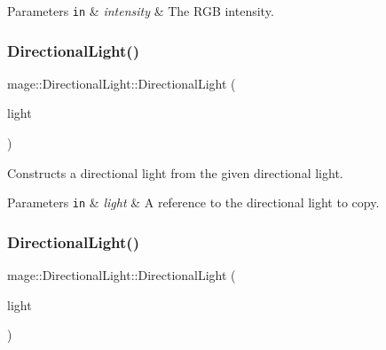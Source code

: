 \begin{DoxyParams}[1]{Parameters}
\mbox{\tt in}  & {\em intensity} & The R\+GB intensity. \\
\hline
\end{DoxyParams}
\hypertarget{classmage_1_1_directional_light_a777b1b8e00a51ba84f6af774a7b519ea}{}\label{classmage_1_1_directional_light_a777b1b8e00a51ba84f6af774a7b519ea} 
\subsubsection{\texorpdfstring{Directional\+Light()}{DirectionalLight()}\hspace{0.1cm}{\footnotesize\ttfamily [2/3]}}
{\footnotesize\ttfamily mage\+::\+Directional\+Light\+::\+Directional\+Light (\begin{DoxyParamCaption}\item[{const \hyperlink{classmage_1_1_directional_light}{Directional\+Light} \&}]{light }\end{DoxyParamCaption})\hspace{0.3cm}{\ttfamily [default]}}

Constructs a directional light from the given directional light.


\begin{DoxyParams}[1]{Parameters}
\mbox{\tt in}  & {\em light} & A reference to the directional light to copy. \\
\hline
\end{DoxyParams}
\hypertarget{classmage_1_1_directional_light_a9563b260b550057e951500c40ecbe2d3}{}\label{classmage_1_1_directional_light_a9563b260b550057e951500c40ecbe2d3} 
\subsubsection{\texorpdfstring{Directional\+Light()}{DirectionalLight()}\hspace{0.1cm}{\footnotesize\ttfamily [3/3]}}
{\footnotesize\ttfamily mage\+::\+Directional\+Light\+::\+Directional\+Light (\begin{DoxyParamCaption}\item[{\hyperlink{classmage_1_1_directional_light}{Directional\+Light} \&\&}]{light }\end{DoxyParamCaption})\hspace{0.3cm}{\ttfamily [default]}}


